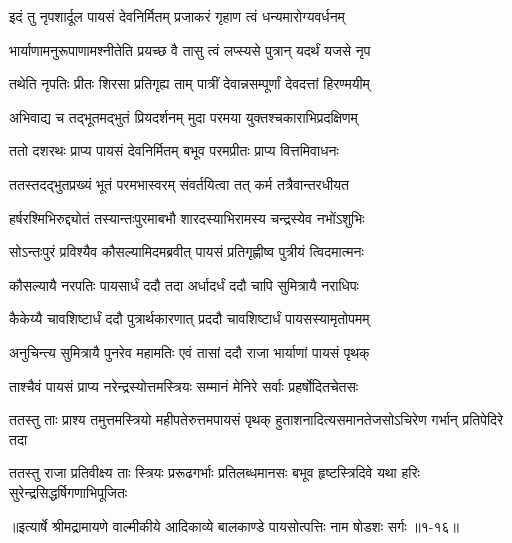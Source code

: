 \twolineshloka
{इदं तु नृपशार्दूल पायसं देवनिर्मितम्}
{प्रजाकरं गृहाण त्वं धन्यमारोग्यवर्धनम्} %

\twolineshloka
{भार्याणामनुरूपाणामश्नीतेति प्रयच्छ वै}
{तासु त्वं लप्स्यसे पुत्रान् यदर्थं यजसे नृप} %

\twolineshloka
{तथेति नृपतिः प्रीतः शिरसा प्रतिगृह्य ताम्}
{पात्रीं देवान्नसम्पूर्णां देवदत्तां हिरण्मयीम्} %

\twolineshloka
{अभिवाद्य च तद्भूतमद्भुतं प्रियदर्शनम्}
{मुदा परमया युक्तश्चकाराभिप्रदक्षिणम्} %

\twolineshloka
{ततो दशरथः प्राप्य पायसं देवनिर्मितम्}
{बभूव परमप्रीतः प्राप्य वित्तमिवाधनः} %

\twolineshloka
{ततस्तदद्भुतप्रख्यं भूतं परमभास्वरम्}
{संवर्तयित्वा तत् कर्म तत्रैवान्तरधीयत} %

\twolineshloka
{हर्षरश्मिभिरुद्द्योतं तस्यान्तःपुरमाबभौ}
{शारदस्याभिरामस्य चन्द्रस्येव नभोंऽशुभिः} %

\twolineshloka
{सोऽन्तःपुरं प्रविश्यैव कौसल्यामिदमब्रवीत्}
{पायसं प्रतिगृह्णीष्व पुत्रीयं त्विदमात्मनः} %

\twolineshloka
{कौसल्यायै नरपतिः पायसार्धं ददौ तदा}
{अर्धादर्धं ददौ चापि सुमित्रायै नराधिपः} %

\twolineshloka
{कैकेय्यै चावशिष्टार्धं ददौ पुत्रार्थकारणात्}
{प्रददौ चावशिष्टार्धं पायसस्यामृतोपमम्} %

\twolineshloka
{अनुचिन्त्य सुमित्रायै पुनरेव महामतिः}
{एवं तासां ददौ राजा भार्याणां पायसं पृथक्} %

\twolineshloka
{ताश्चैवं पायसं प्राप्य नरेन्द्रस्योत्तमस्त्रियः}
{सम्मानं मेनिरे सर्वाः प्रहर्षोदितचेतसः} %

\twolineshloka
{ततस्तु ताः प्राश्य तमुत्तमस्त्रियो महीपतेरुत्तमपायसं पृथक्}
{हुताशनादित्यसमानतेजसोऽचिरेण गर्भान् प्रतिपेदिरे तदा} %

\twolineshloka
{ततस्तु राजा प्रतिवीक्ष्य ताः स्त्रियः प्ररूढगर्भाः प्रतिलब्धमानसः}
{बभूव हृष्टस्त्रिदिवे यथा हरिः सुरेन्द्रसिद्धर्षिगणाभिपूजितः} %


॥इत्यार्षे श्रीमद्रामायणे वाल्मीकीये आदिकाव्ये बालकाण्डे पायसोत्पत्तिः नाम षोडशः सर्गः ॥१-१६॥
